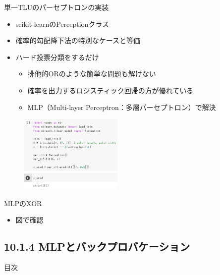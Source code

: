\documentclass[aspectratio=169, dvipdfmx, 14pt, xcolor={svgnames,dvipsnames}]{beamer}
\def\tightlist{\itemsep1pt\parskip0pt\parsep0pt}
\begin{document}
\begin{frame}{\quad 単一TLUのパーセプトロンの実装}
  \begin{itemize}
    \tightlist
    \item
          scikit-learnのPerceptionクラス
    \item
          確率的勾配降下法の特別なケースと等価
    \item
          ハード投票分類をするだけ

          \begin{itemize}
            \tightlist
            \item
                  排他的ORのような簡単な問題も解けない
            \item
                  確率を出力するロジスティック回帰の方が優れている
            \item
                  MLP（Multi-layer Perceptron：多層パーセプトロン）で解決
          \end{itemize}
  \end{itemize}
  \begin{figure}[H]
    \centering
    \includegraphics[width=50mm]{img/perceptron_iris.png}
  \end{figure}
\end{frame}


\begin{frame}{\quad MLPのXOR}
  \begin{itemize}
    \item
          図で確認
  \end{itemize}
\end{frame}


\hypertarget{mlpux3068ux30d0ux30c3ux30afux30d7ux30edux30d0ux30b1ux30fcux30b7ux30e7ux30f3}{%
  \subsection{10.1.4
    MLPとバックプロバケーション}\label{mlpux3068ux30d0ux30c3ux30afux30d7ux30edux30d0ux30b1ux30fcux30b7ux30e7ux30f3}}
\begin{frame}{\quad 目次}
  \tableofcontents[currentsubsection]
\end{frame}
\end{document}
